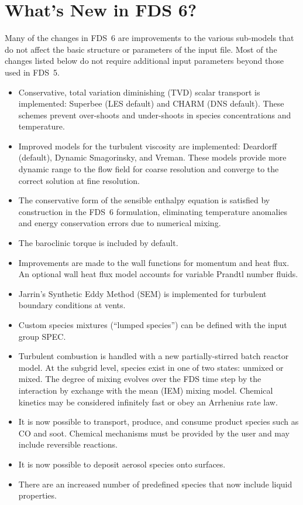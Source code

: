 \documentclass[11pt]{book}
\begin{document}
\section{What's New in FDS 6?}

Many of the changes in FDS~6 are improvements to the various sub-models that do not affect the basic structure or parameters of the input file. Most of the changes listed below do not require additional input parameters beyond those used in FDS~5.

\vspace{\baselineskip}


   \begin{itemize}
   \item Conservative, total variation diminishing (TVD) scalar transport is implemented: Superbee (LES default) and CHARM (DNS default). These schemes prevent over-shoots and under-shoots in species concentrations and temperature.
   \item Improved models for the turbulent viscosity are implemented: Deardorff (default), Dynamic Smagorinsky, and Vreman. These models provide more dynamic range to the flow field for coarse resolution and converge to the correct solution at fine resolution.
   \item The conservative form of the sensible enthalpy equation is satisfied by construction in the FDS~6 formulation, eliminating temperature anomalies and energy conservation errors due to numerical mixing.
   \item The baroclinic torque is included by default.
   \item Improvements are made to the wall functions for momentum and heat flux. An optional wall heat flux model accounts for variable Prandtl number fluids.
   \item Jarrin's Synthetic Eddy Method (SEM) is implemented for turbulent boundary conditions at vents.
   \end{itemize}


    \begin{itemize}
    \item Custom species mixtures (``lumped species'') can be defined with the input group SPEC.
    \item Turbulent combustion is handled with a new partially-stirred batch reactor model. At the subgrid level, species exist in one of two states: unmixed or mixed. The degree of mixing evolves over the FDS time step by the interaction by exchange with the mean (IEM) mixing model. Chemical kinetics may be considered infinitely fast or obey an Arrhenius rate law.
    \item It is now possible to transport, produce, and consume product species such as CO and soot. Chemical mechanisms must be provided by the user and may include reversible reactions.
    \item It is now possible to deposit aerosol species onto surfaces.
    \item There are an increased number of predefined species that now include liquid properties.
    \end{itemize}
\end{document}
